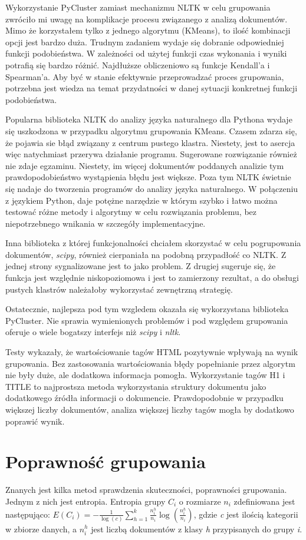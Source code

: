 \documentclass{article}
\begin{document}
Wykorzystanie PyCluster zamiast mechanizmu NLTK w celu grupowania zwróciło mi uwagę na komplikacje procesu związanego z analizą dokumentów. Mimo że korzystałem tylko z jednego algorytmu (KMeans), to ilość kombinacji opcji jest bardzo duża. Trudnym zadaniem wydaje się dobranie odpowiedniej funkcji podobieństwa. W zależności od użytej funkcji czas wykonania i wyniki potrafią się bardzo różnić. Najdłuższe obliczeniowo są funkcje Kendall'a i Spearman'a.
Aby być w stanie efektywnie przeprowadzać proces grupowania, potrzebna jest wiedza na temat przydatności w danej sytuacji konkretnej funkcji podobieństwa.

Popularna biblioteka NLTK do analizy języka naturalnego dla Pythona wydaje się uszkodzona w przypadku algorytmu grupowania KMeans. Czasem zdarza się, że pojawia sie błąd związany z centrum pustego klastra. Niestety, jest to asercja więc natychmiast przerywa działanie programu. Sugerowane rozwiązanie również nie zdaje egzaminu. Niestety, im więcej dokumentów poddanych analizie tym prawdopodobieństwo wystąpienia błędu jest większe. Poza tym NLTK świetnie się nadaje do tworzenia programów do analizy języka naturalnego. W połączeniu z językiem Python, daje potężne narzędzie w którym szybko i łatwo można testować różne metody i algorytmy w celu rozwiązania problemu, bez niepotrzebnego wnikania w szczegóły implementacyjne.

Inna biblioteka z której funkcjonalności chciałem skorzystać w celu pogrupowania dokumentów, \emph{scipy}, również cierpaniała na podobną przypadłość co NLTK. Z jednej strony sygnalizowane jest to jako problem. Z drugiej sugeruje się, że funkcja jest względnie niskopoziomowa i jest to zamierzony rezultat, a do obsługi pustych klastrów należałoby wykorzystać zewnętrzną strategię. 

Ostatecznie, najlepsza pod tym wzgledem okazała się wykorzystana biblioteka PyCluster. Nie sprawia wymienionych problemów i pod względem grupowania oferuje o wiele bogatszy interfejs niż \emph{scipy} i \emph{nltk}.

Testy wykazały, że wartościowanie tagów HTML pozytywnie wpływają na wynik grupowania. Bez zastosowania wartościowania błędy popełnianie przez algorytm nie były duże, ale dodatkowa informacja pomogła. Wykorzystanie tagów H1 i TITLE to najprostsza metoda wykorzystania struktury dokumentu jako dodatkowego źródła informacji o dokumencie. Prawdopodobnie w przypadku większej liczby dokumentów, analiza większej liczby tagów mogła by dodatkowo poprawić wynik.


\section{Poprawność grupowania}
Znanych jest kilka metod sprawdzenia skuteczności, poprawności grupowania. Jednym z nich jest entropia. Entropia grupy \( C_{i} \) o rozmiarze \( n_{i} \) zdefiniowana jest następująco:
\( E(C_{i}) = -\frac{1}{\log(c)}\sum_{h=1}^{k}\frac{n_i^h}{n_i}\log(\frac{n_i^h}{n_i}) \), gdzie \emph{c} jest ilością kategorii w zbiorze danych, a \( n_i^h  \) jest liczbą dokumentów z klasy \emph{h} przypisanych do grupy \emph{i}. 
\end{document}
